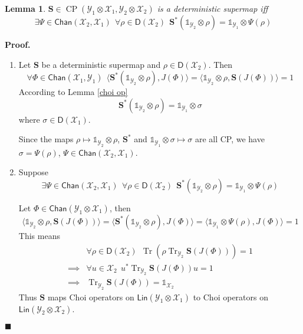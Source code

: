 \documentclass[aps,pra,onecolumn,notitlepage,superscriptaddress]{revtex4-1}
\newcommand{\spc}[1]{\mathcal{#1}}
\newcommand{\Lin}{\mathsf{Lin}}
\newcommand{\D}{\mathsf{D}}
\def\>{\rangle}
\def\<{\langle}
\newcommand{\bs}[1]{\boldsymbol{#1}}
\newcommand{\Tr}{\operatorname{Tr}}
\newcommand{\op}[1]{\operatorname{#1}}
\newcommand{\Chan}{{\mathsf{Chan}}}
\newcommand\I{\mathds{1}}
\newtheorem{lemma}{Lemma}
\def\Proof{{\bf Proof.~}}
\def\qed{$\blacksquare$ \newline}
\begin{document}
    \begin{lemma}
        $\bs{S} \in  \op{CP}(\spc Y_1 \otimes \spc X_1, \spc Y_2 \otimes \spc X_2)$ is a deterministic supermap iff
        \begin{equation}
            \exists \Psi \in \Chan(\spc X_2, \spc X_1) \ \ \forall \rho \in \D(\spc X_2) \ \ \bs{S}^* (\I_{\spc Y_2} \otimes \rho) = \I_{\spc Y_1} \otimes \Psi(\rho)
        \end{equation}
    \end{lemma}

    \Proof {
        \begin{enumerate}
            \item Let $\bs{S}$ be a deterministic supermap and $\rho \in \D(\spc X_2)$. Then
            \begin{equation}
                \forall \Phi \in \Chan(\spc X_1, \spc Y_1) \ \ \<\bs{S}^*(\I_{\spc Y_2} \otimes \rho), J(\Phi)\> = \<\I_{\spc Y_2} \otimes \rho , \bs{S}(J(\Phi)) \> = 1
            \end{equation}
            According to Lemma \ref{choi op}
            \begin{equation}
                \bs{S}^*(\I_{\spc Y_2} \otimes \rho) = \I_{\spc Y_1} \otimes \sigma
            \end{equation}
            where $\sigma \in \D(\spc X_1)$.
    
            Since the maps $\rho \mapsto \I_{\spc Y_2} \otimes \rho$, $\bs{S}^*$ and $\I_{\spc Y_1} \otimes \sigma \mapsto \sigma$ are all CP, we have $\sigma = \Psi(\rho)$, $\Psi \in \Chan(\spc X_2, \spc X_1)$.

            \item Suppose
            \begin{equation}
                \exists \Psi \in \Chan(\spc X_2, \spc X_1) \ \ \forall \rho \in \D(\spc X_2) \ \ \bs{S}^* (\I_{\spc Y_2} \otimes \rho) = \I_{\spc Y_1} \otimes \Psi(\rho)
            \end{equation}

            Let $\Phi \in \Chan(\spc Y_1 \otimes \spc X_1)$, then
            \begin{equation}
                \<\I_{\spc Y_2} \otimes \rho , \bs{S}(J(\Phi)) \> = \<\bs{S}^*(\I_{\spc Y_2} \otimes \rho), J(\Phi)\> = \< \I_{\spc Y_1} \otimes \Psi(\rho), J(\Phi) \> = 1
            \end{equation}
            This means
            \begin{align}
                &\forall \rho \in \D(\spc X_2) \ \ \Tr(\rho \Tr_{\spc Y_2} \bs{S}(J(\Phi))) = 1 \\
                \implies& \forall u \in \spc X_2 \ \ u^* \Tr_{\spc Y_2} \bs{S}(J(\Phi)) u = 1 \\
                \implies& \Tr_{\spc Y_2} \bs{S}(J(\Phi)) = \I_{\spc X_2}
            \end{align}
            Thus $\bs{S}$ maps Choi operators on $\Lin(\spc Y_1 \otimes \spc X_1)$ to Choi operators on $\Lin(\spc Y_2 \otimes \spc X_2)$.
        \end{enumerate}
    } \qed
\end{document}
